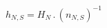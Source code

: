 \documentclass[border=2pt]{standalone}
\begin{document}
${h}{_{N, S}}={H}{_{N}} \, . \, \left( {n}{_{N, S}} \right)^{-1}$
\end{document}
